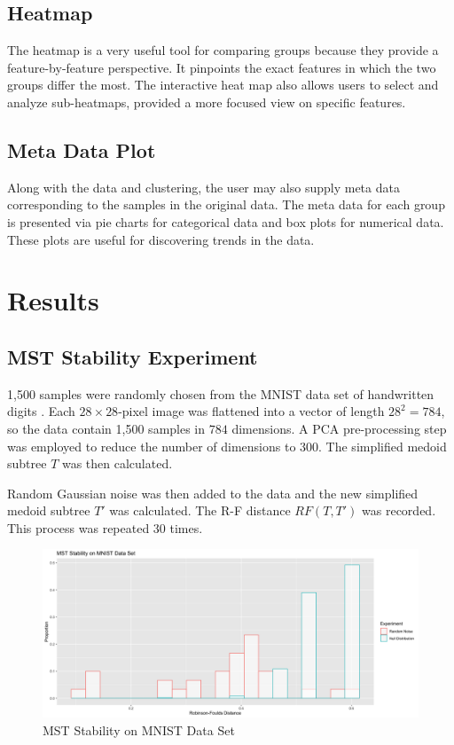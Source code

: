 \documentclass{article}
\begin{document}
\subsection{Heatmap}
The heatmap is a very useful tool for comparing groups because they provide a feature-by-feature perspective. It pinpoints the exact features in which the two groups differ the most. The interactive heat map also allows users to select and analyze sub-heatmaps, provided a more focused view on specific features.

\subsection{Meta Data Plot}
Along with the data and clustering, the user may also supply meta data corresponding to the samples in the original data. The meta data for each group is presented via pie charts for categorical data and box plots for numerical data. These plots are useful for discovering trends in the data.

\section{Results}

\subsection{MST Stability Experiment}
1,500 samples were randomly chosen from the MNIST data set of handwritten digits \cite{MNIST}. Each $28 \times 28$-pixel image was flattened into a vector of length $28^2 = 784$, so the data contain 1,500 samples in $784$ dimensions. A PCA pre-processing step was employed to reduce the number of dimensions to 300. The simplified medoid subtree $T$ was then calculated.

Random Gaussian noise was then added to the data and the new simplified medoid subtree $T'$ was calculated. The R-F distance $RF(T, T')$ was recorded. This process was repeated 30 times.

\renewcommand{\figurename}{Figure}
\renewcommand{\thefigure}{1}
\begin{figure}[!t]
\centering
\includegraphics[scale=0.3]{RF stability}
\caption{MST Stability on MNIST Data Set}
\end{figure}
\end{document}
